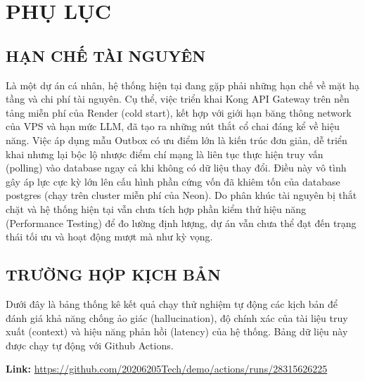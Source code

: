 \newpage
{}
{\centering \section*{PHỤ LỤC}}

\setcounter{figure}{0}
\renewcommand{\thefigure}{PL.\arabic{figure}}
\setcounter{table}{0}
\renewcommand{\thetable}{PL.\arabic{table}}

\subsection*{HẠN CHẾ TÀI NGUYÊN}

Là một dự án cá nhân,
hệ thống hiện tại đang gặp phải những
hạn chế
về mặt hạ tầng và chi phí tài nguyên.
Cụ thể, việc triển khai Kong API Gateway
trên nền tảng miễn phí của Render (cold start),
kết hợp với giới hạn
băng thông network của VPS
và hạn mức LLM, đã tạo ra những nút thắt cổ chai đáng kể về hiệu năng.
Việc áp dụng mẫu Outbox có ưu điểm lớn là kiến trúc đơn giản,
dễ triển khai
nhưng lại bộc lộ nhược điểm chí mạng là liên tục thực hiện truy vấn (polling) vào database ngay cả khi không có dữ liệu thay đổi.
Điều này vô tình gây áp lực cực kỳ lớn lên cấu hình phần cứng vốn đã khiêm tốn của database postgres (chạy trên cluster miễn phí của Neon).
Do phân khúc tài nguyên bị thắt chặt và hệ thống hiện tại vẫn chưa tích hợp phần kiểm thử hiệu năng (Performance Testing) để đo lường định lượng, dự án vẫn chưa thể đạt đến trạng thái tối ưu và hoạt động mượt mà như kỳ vọng.


\subsection*{TRƯỜNG HỢP KỊCH BẢN}

Dưới đây là bảng thống kê kết quả chạy thử nghiệm tự động các kịch bản
để đánh giá khả năng chống ảo giác (hallucination), độ chính xác của tài liệu truy xuất (context) và hiệu năng phản hồi (latency) của hệ thống.
Bảng dữ liệu
này
được chạy tự động
với Github Actions.

\textbf{Link:} \url{https://github.com/20206205Tech/demo/actions/runs/28315626225}

